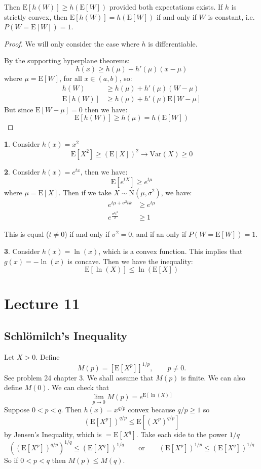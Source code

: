 \documentclass[english,12pt]{article}
\theoremstyle{plain}
\theoremstyle{definition}
\newtheorem*{example}{\protect\examplename}
\theoremstyle{definition} %
\newcommand{\eg}[1]{\begin{example} #1 \end{example} }
\newcommand{\prf}[1]{\begin{proof} #1 \end{proof} }
\providecommand{\examplename}{Example}
\newcommand{\ex}[1]{\mbox{E} \left[ #1 \right]}
\newcommand{\var}[1]{\mbox{Var} \left( #1 \right)}
\begin{document}
Then $\ex{h(W)}\ge h(\ex{W})$ provided both expectations exists.  If $h$ is strictly convex, then $\ex{h(W)}=h(\ex{W})$ if and only if $W$ is constant, i.e. $P(W=\ex{W})=1$.

\prf{
We will only consider the case where $h$ is differentiable.

By the supporting hyperplane theorems:
\[h(x)\ge h(\mu)+h'(\mu)(x-\mu)\]
where $\mu=\ex{W}$, for all $x\in(a,b)$, so:
\begin{align*}
h(W)&\ge h(\mu)+h'(\mu)(W-\mu)\\
\ex{h(W)}&\ge h(\mu)+h'(\mu)\ex{W-\mu}
\end{align*}
But since $\ex{W-\mu}=0$ then we have:
\[\ex{h(W)}\ge h(\mu)=h(\ex{W})\]
}

\eg{
Consider $h(x)=x^2$
\[\ex{X^2}\ge(\ex{X})^2\rightarrow\var{X}\ge 0\]
}

\eg{
Consider $h(x)=e^{tx}$, then we have:
\[\ex{e^{tX}}\ge e^{t\mu}\]
where $\mu=\ex{X}$.  Then if we take $X\sim\text{N}(\mu,\sigma^2)$, we have:
\begin{align*}
e^{t\mu+\sigma^2tk}&\ge e^{t\mu}\\
e^{\frac{\sigma^2t^2}{2}}&\ge 1
\end{align*}

This is equal ($t\ne 0$) if and only if $\sigma^2=0$, and if an only if $P(W=\ex{W})=1$. 
}

\eg{
Consider $h(x)=\ln(x)$, which is a convex function.  This implies that $g(x)=-\ln(x)$ is concave.  Then we have the inequality:
\[\ex{\ln(X)}\le\ln(\ex{X})\]
}

\section*{Lecture 11}

\subsection{Schl\"{o}milch's Inequality}
Let $X > 0$. Define
\[ M(p) = [\ex{X^p}]^{1/p}, \qquad p \neq 0. \]
See problem 24 chapter 3. We shall assume that $M( p )$ is finite. We can also define $M(0)$. We can check that
\[ \lim_{p \to 0} M(p ) = e^{\text{E}[\ln(X)]} \]
Suppose $0 < p < q$. Then $h(x) = x^{q/p}$ convex because $q/p \geq 1$ so
\[ (\ex{X^p})^{q/p} \leq \ex{(X^p)^{q/p}} \]
by Jensen's Inequality, which is $= \ex{X^q}$. Take each side to the power $1/q$
\[ ((\ex{X^p})^{q/p})^{1/q} \leq (\ex{X^q})^{1/q} \qquad \text{or} \qquad (\ex{X^p})^{1/p} \leq (\ex{X^q})^{1/q} \]
So if $0 < p < q$ then $M( p ) \leq M( q )$.
\end{document}
